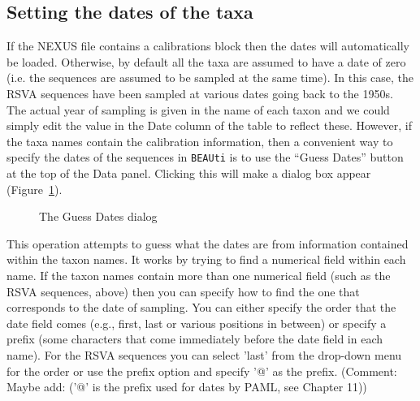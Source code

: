 \documentclass[cup7b, english]{cupbook}
\begin{document}
\subsection{Setting the dates of the taxa}

If the NEXUS file contains a calibrations block then the dates will automatically be loaded. Otherwise, by default
all the taxa are assumed to have a date of zero (i.e. the sequences are assumed to be sampled at the same time).
In this case, the RSVA sequences have been sampled at various dates going back to the 1950s. The actual year of
sampling is given in the name of each taxon and we could simply edit the value in the Date column of the table to
reflect these. However, if the taxa names contain the calibration information, then a convenient way to specify
the dates of the sequences in \texttt{BEAUti} is to use the ``Guess Dates'' button at the top of the Data panel. Clicking this
will make a dialog box appear (Figure~\ref{fig:figure2}).

\begin{figure}[htbp]
\begin{center}
\leavevmode
{}
\end{center}
\caption{The Guess Dates dialog}
\label{fig:figure2}
\end{figure}

This operation attempts to guess what the dates are from information contained within the taxon names.
It works by trying to find a numerical field within each name. If the taxon names contain more than one
numerical field (such as the RSVA sequences, above) then you can specify how to find the one that
corresponds to the date of sampling. You can either specify the order that the date field comes (e.g.,
first, last or various positions in between) or specify a prefix (some characters that come immediately
before the date field in each name). For the RSVA sequences you can select 'last' from the drop-down menu
for the order or use the prefix option and specify '@' as the prefix. (Comment: Maybe add:  ('@' is the prefix used for dates by PAML, see Chapter 11))
\end{document}
